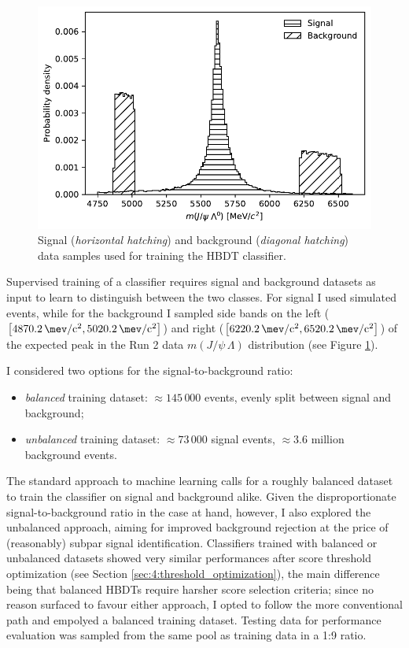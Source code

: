 \begin{figure}[t]
	\centering
	\includegraphics[width=.6\textwidth]{graphics/04-event_selection/sig_bkg_distribution_balance.pdf}
	\caption{Signal (\textit{horizontal hatching}) and background (\textit{diagonal hatching}) data samples used for training the HBDT classifier.
	}
	\label{fig:4:HBDT_training_data}
\end{figure}

Supervised training of a classifier requires signal and background datasets as input to learn to distinguish between the two classes.
For signal I used simulated \demonstratorshort events, while for the background I sampled side bands on the left ($\left[\SI{4870.2}{\mev \per c^2}, \SI{5020.2}{\mev \per c^2}\right]$) and right ($\left[\SI{6220.2}{\mev \per c^2}, \SI{6520.2}{\mev \per c^2}\right]$) of the expected \lbz peak  in the Run 2 data $m(J/\psi\,\Lambda)$ distribution (see Figure \ref{fig:4:HBDT_training_data}).

I considered two options for the signal-to-background ratio:
\begin{itemize}
	\item \textit{balanced} training dataset: $\approx 145\,000$ events, evenly split between signal and background;
	\item \textit{unbalanced} training dataset: $\approx 73\,000$ signal events, $\approx 3.6$ million background events.
\end{itemize}
The standard approach to machine learning calls for a roughly balanced dataset to train the classifier on signal and background alike.
Given the disproportionate signal-to-background ratio in the case at hand, however, I also explored the unbalanced approach, aiming for improved background rejection at the price of (reasonably) subpar signal identification.
Classifiers trained with balanced or unbalanced datasets showed very similar performances after score threshold optimization (see Section \ref{sec:4:threshold_optimization}), the main difference being that balanced HBDTs require harsher score selection criteria;
since no reason surfaced to favour either approach, I opted to follow the more conventional path and empolyed a balanced training dataset.
Testing data for performance evaluation was sampled from the same pool as training data in a 1:9 ratio.

